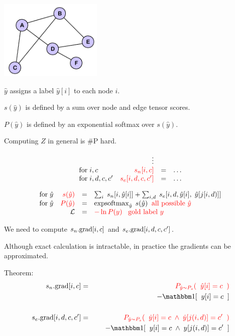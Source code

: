 {
\centerline{\includegraphics[height= 1.5in]{../images/Graph}}
\medskip
$\hat{y} $ assigns a label $\hat{y}[i]$ to each node $i$.

\vfill
$s(\hat{y})$ is defined by a sum over node and edge tensor scores.

\vfill
$P(\hat{y})$ is defined by an exponential softmax over $s(\hat{y})$.

\vfill
Computing $Z$ in general is \#P hard.


$$\begin{array}{lrcl}
& \vdots \\
\mathrm{for}\;i,c & \;{\color{red} s_n[i,c]} & = & \ldots \\
\mathrm{for}\;i,d,c,c' & {\color{red} s_e[i,d,c,c']} & = & \ldots
\end{array}$$

$$\begin{array}{lrcl}
\mbox{for}\;\hat{y} & {\color{red} s(\hat{y})} & = & \sum_i\;s_n[i,\hat{y}[i]] + \sum_{i,d}\;s_e[i,d,\hat{y}[i],\;\hat{y}[j[i,d)]] \\
\mbox{for}\;\hat{y} & {\color{red} P(\hat{y})} & = & \operatorname*{expsoftmax}_{\hat{y}}\;s(\hat{y}) \;\;\mbox{\color{red} all possible $\hat{y}$} \\
 & {\cal L} & = & {\color{red} - \ln P(y) \;\;\;\mbox{gold label $y$}}
\end{array}$$

\vfill
We need to compute {\color{red} $s_n.\mathrm{grad}[i,c]$} and {\color{red} $s_e.\mathrm{grad}[i,d,c,c']$}.

\vfill
Although exact calculation is intractable, in practice the gradients can be approximated.


Theorem:
\begin{eqnarray*}
    s_n.\mathrm{grad}[i,c] & = &  {\color{red} P_{\hat{y} \sim P_s}(\;\;\hat{y}[i] = c\;\;)} \\
    & & \;\;\;\;\;- \bbone[\;\;y[i] = c\;\;] \\
    \\
    s_e.\mathrm{grad}[i,d,c,c'] & = &  {\color{red} P_{\hat{y} \sim P_s}(\;\;\hat{y}[i] = c \; \wedge \; \hat{y}[j(i,d)] = c'\;\;)} \\
    & & \;\;\;\;\;- \bbone[\;\;y[i] = c\; \wedge \; y[j(i,d)] =
    c'\;\;]
\end{eqnarray*}

}
